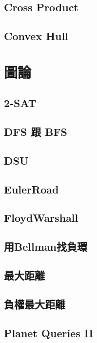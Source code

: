 \subsection{Cross Product} 

\subsection{Convex Hull} 


\section{圖論}
\subsection{2-SAT} 

\subsection{DFS 跟 BFS} 

\subsection{DSU} 

\subsection{EulerRoad} 

\subsection{FloydWarshall} 

\subsection{用Bellman找負環} 

\subsection{最大距離} 

\subsection{負權最大距離} 

\subsection{Planet Queries II} 

